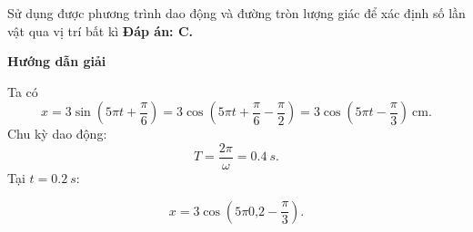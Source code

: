 \begin{dang}{Sử dụng được phương trình dao động và đường tròn lượng giác để xác định số lần vật qua vị trí bất kì}
{		\textbf{Đáp án: C.}
	}
	
	{\begin{center}
			\textbf{Hướng dẫn giải}
		\end{center}
		
		Ta có
		\begin{equation*}
			x=3\sin \left (5\pi t +\dfrac{\pi}{6}\right) = 3 \cos \left (5\pi t + \dfrac{\pi}{6}- \dfrac{\pi}{2}\right) = 3\cos \left (5\pi t - \dfrac{\pi}{3}\right)\ \text{cm}.
		\end{equation*}
		Chu kỳ dao động: 
		\begin{equation*} 
			T =\dfrac{2\pi}{\omega} =\SI{0,4}{s}.
		\end{equation*}
		Tại $t =\SI{0,2}{s}$:
		
		\begin{equation*}
			x=3\cos \left(5\pi \text{0,2} -\dfrac{\pi}{3}\right).
		\end{equation*}
		
}
\end{dang}
